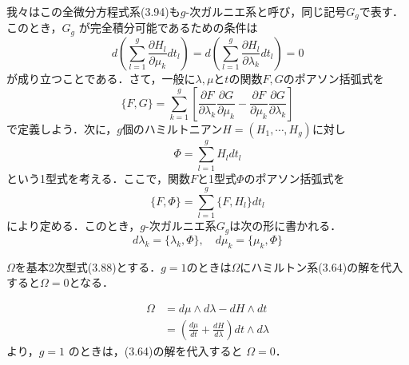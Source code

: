 \begin{story}

我々はこの全微分方程式系(3.94)も$g$-次ガルニエ系と呼び，同じ記号$G_g$で表す．このとき，$G_g$ が完全積分可能であるための条件は
\begin{equation}
    d\left( \sum_{l=1}^g \frac{\partial H_l}{\partial \mu_k} dt_l \right) = d\left( \sum_{l=1}^g \frac{\partial H_l}{\partial \lambda_k} dt_l \right) = 0 \tag{3.95}
\end{equation}
が成り立つことである．さて，一般に$\lambda, \mu$と$t$の関数$F, G$のポアソン括弧式を
\begin{equation*}
    \{F, G\} = \sum_{k=1}^g \left[ \frac{\partial F}{\partial \lambda_k} \frac{\partial G}{\partial \mu_k} - \frac{\partial F}{\partial \mu_k} \frac{\partial G}{\partial \lambda_k} \right]
\end{equation*}
で定義しよう．次に，$g$個のハミルトニアン$H=(H_1, \cdots, H_g)$に対し
\begin{equation*}
    \Phi = \sum_{l=1}^g H_l dt_l
\end{equation*}
という1型式を考える．ここで，関数$F$と1型式$\Phi$のポアソン括弧式を
\begin{equation*}
    \{F, \Phi\} = \sum_{l=1}^g \{F, H_l\} dt_l
\end{equation*}
により定める．このとき，$g$-次ガルニエ系$G_g$は次の形に書かれる．
\begin{equation*}
    d\lambda_k = \{\lambda_k, \Phi\}, \quad d\mu_k = \{\mu_k, \Phi\}
\end{equation*}

$\Omega$を基本2次型式(3.88)とする．$g=1$のときは$\Omega$にハミルトン系(3.64)の解を代入すると$\Omega=0$となる．
\end{story}
\begin{align*}
    \Omega &= d\mu \wedge d\lambda - dH \wedge dt \\
    &= \left( \frac{d\mu}{dt} + \frac{dH}{d\lambda} \right) dt \wedge d\lambda
\end{align*}
より，$g=1$ のときは，(3.64)の解を代入すると $\Omega = 0$．
